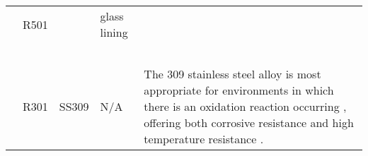 {\begin{tabular}{@{}lp{5cm}p{2cm}p{2cm}p{12cm}@{}}
                                                      & R501                                                   &                                                                                        & glass lining                                      &                                                                                                                                                                                                                                                                                                                                                                                                                                                                                                                                                                                                                                                                                                                                                                                                                                                                                                                    \\ \\ \\ \\ \\ \\ \cmidrule(l){2-5}
                                                      & R301                                                   & \multirow[t]{2}{=}{SS309}                                                                 & \multirow[t]{2}{=}{N/A}                              & \multirow[t]{2}{=}{The 309 stainless steel alloy is most appropriate for environments in which there is an oxidation reaction occurring \cite{cous}, offering both corrosive resistance and high temperature resistance .}                                                                                                                                                                                                                                                                                                                                                                                                                                                                                                                                                                                                                                                                                                          \\ \cmidrule(l){2-2}

\end{tabular}}
